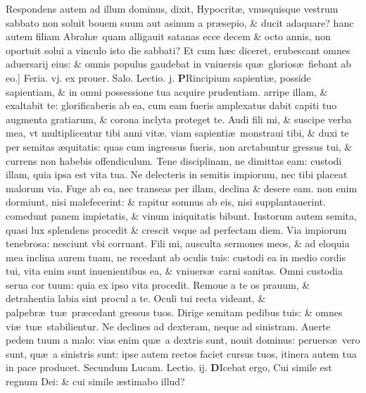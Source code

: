 \documentclass[a5paper,10pt]{book}
\def\leftmarginnote{%
	\lrmarginnote{\hskip -\marginparsep \hskip -6.5em}}
\def\rightmarginnote{%
	\lrmarginnote{\hskip\columnwidth \hskip -1em}}
\def\ae{æ}
\begin{document}
\begin{multicols*}{2}
Respondens autem ad illum dominus, dixit, Hypocrit\ae , vnusquisque vestrum sabbato non soluit bouem suum aut asinum a pr\ae sepio, \& ducit adaquare?
hanc autem filiam Abrah\ae \ quam alligauit satanas ecce decem \& octo annis, non oportuit solui a vinculo isto die sabbati?
Et cum h\ae c diceret, erubescant omnes aduersarij eius: \& omnis populus gaudebat in vniuersis qu\ae \ glorios\ae \ fiebant ab eo.]
\newline {} \color{red} \hypertarget{FRI-PRIMA-POST-ADV}{Feria. vj.} ex prouer. Salo. \hfill Lectio. j. \color{black}
\vspace{-2.25em}
\lettrine[lines=2]{\bfseries P}{}Rincipium\rightmarginnote{ca. 4.} sapienti\ae , posside sapientiam, \& in omni possessione tua acquire prudentiam.
arripe illam, \& exaltabit te: glorificaberis ab ea, cum eam fueris amplexatus dabit capiti tuo augmenta gratiarum, \& corona inclyta proteget te.
Audi fili mi, \& suscipe verba mea, vt multiplicentur tibi anni vit\ae . viam sapienti\ae \ monstraui tibi, \& duxi te per semitas \ae quitatis: quas cum ingressus fueris, non arctabuntur gressus tui, \& currens non habebis offendiculum.
Tene disciplinam, ne dimittas eam: custodi illam, quia ipsa est vita tua.
Ne delecteris in semitis impiorum, nec tibi placeat malorum via. Fuge ab ea, nec transeas per illam, declina \& desere eam.
non enim dormiunt, nisi malefecerint: \& rapitur somnus ab eis, nisi supplantauerint. comedunt panem impietatis, \& vinum iniquitatis bibunt.
Iustorum autem semita, quasi lux splendens procedit \& crescit vsque ad perfectam diem.
Via impiorum tenebrosa: nesciunt vbi corruant.
Fili mi,
ausculta sermones meos, \& ad eloquia mea inclina aurem tuam, ne recedant ab oculis tuis: custodi ea in medio cordis tui, vita enim sunt inuenientibus ea, \& vniuers\ae \ carni sanitas.
Omni custodia serua cor tuum: quia ex ipso vita procedit. Remoue a te os prauum, \& detrahentia labia sint procul a te.
Oculi tui recta videant, \& palpebr\ae \ tu\ae \ pr\ae cedant gressus tuos.
Dirige semitam pedibus tuis: \& omnes vi\ae \ tu\ae \ stabilientur.
Ne declines ad dexteram, neque ad sinistram. Auerte pedem tuum a malo: vias enim qu\ae \ a dextris sunt, nouit dominus: peruers\ae \ vero sunt, qu\ae \ a sinistris sunt: ipse autem rectos faciet cursus tuos, itinera autem tua in pace producet.
\newline \color{red} Secundum Lucam. \hfill Lectio. ij. \color{black}
\vspace{-.25em}
\lettrine[lines=2]{\bfseries \color{red} D}{}Icebat\leftmarginnote{\begin{flushright}c. 13.\end{flushright}} ergo, Cui simile est regnum Dei: \& cui simile \ae stimabo illud?

\end{multicols*}
\end{document}
